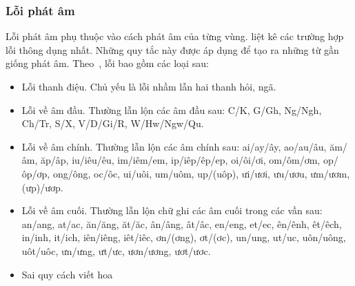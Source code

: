 \documentclass[a4paper,oneside,14pt]{extbook} %
\begin{document}

\subsubsection{Lỗi phát âm}
\label{sec:realword:recover:sound}

Lỗi phát âm phụ thuộc vào cách phát âm của từng
vùng. \cite{LoiChinhTa} liệt kê các trường hợp lỗi thông dụng
nhất. Những quy tắc này được áp dụng để tạo ra những từ gần giống phát
âm.
Theo~\cite{LoiChinhTa}, lỗi bao gồm các loại sau:
\begin{itemize}
\item Lỗi thanh điệu. Chủ yếu là lỗi nhầm lẫn hai thanh hỏi, ngã.
\item Lỗi về âm đầu. Thường lẫn lộn các âm đầu sau: C/K, G/Gh, Ng/Ngh,
  Ch/Tr, S/X, V/D/Gi/R, W/Hw/Ngw/Qu.
\item Lỗi về âm chính. Thường lẫn lộn các âm chính sau: ai/ay/ây,
  ao/au/âu, ăm/âm, ăp/âp, iu/iêu/êu, im/iêm/em, ip/iêp/êp/ep,
  oi/ôi/ơi, om/ôm/ơm, op/ôp/ơp, ong/ông, oc/ôc, ui/uôi, um/uôm, up/(uôp),
  ưi/ươi, ưu/ươu, ưm/ươm, (ưp)/ươp.
\item Lỗi về âm cuối. Thường lẫn lộn chữ ghi các âm cuối trong các vần
  sau:
  an/ang, at/ac, ăn/ăng, ăt/ăc, ân/âng, ât/âc, en/eng, et/ec, ên/ênh,
  êt/êch, in/inh, it/ich, iên/iêng, iêt/iêc, ơn/(ơng), ơt/(ơc),
  un/ung, ut/uc, uôn/uông, uôt/uôc, ưn/ưng, ưt/ưc, ươn/ương, ươt/ươc.
\item Sai quy cách viết hoa
\end{itemize}
\end{document}
